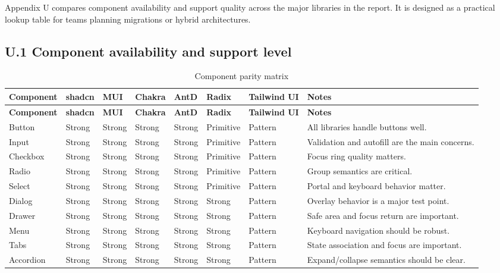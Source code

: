 Appendix U compares component availability and support quality across the major libraries in the report. It is designed as a practical lookup table for teams planning migrations or hybrid architectures.

\subsection*{U.1 Component availability and support level}
\begin{longtable}{@{}p{}p{}p{}p{}p{}p{}p{}p{}@{}}
\caption{Component parity matrix}\label{tab:parity-matrix}\\
\toprule
\textbf{Component} & \textbf{shadcn} & \textbf{MUI} & \textbf{Chakra} & \textbf{AntD} & \textbf{Radix} & \textbf{Tailwind UI} & \textbf{Notes} \\
\midrule
\endfirsthead
\toprule
\textbf{Component} & \textbf{shadcn} & \textbf{MUI} & \textbf{Chakra} & \textbf{AntD} & \textbf{Radix} & \textbf{Tailwind UI} & \textbf{Notes} \\
\midrule
\endhead
\bottomrule
\endfoot
Button & Strong & Strong & Strong & Strong & Primitive & Pattern & All libraries handle buttons well. \\
Input & Strong & Strong & Strong & Strong & Primitive & Pattern & Validation and autofill are the main concerns. \\
Checkbox & Strong & Strong & Strong & Strong & Primitive & Pattern & Focus ring quality matters. \\
Radio & Strong & Strong & Strong & Strong & Primitive & Pattern & Group semantics are critical. \\
Select & Strong & Strong & Strong & Strong & Primitive & Pattern & Portal and keyboard behavior matter. \\
Dialog & Strong & Strong & Strong & Strong & Strong & Pattern & Overlay behavior is a major test point. \\
Drawer & Strong & Strong & Strong & Strong & Strong & Pattern & Safe area and focus return are important. \\
Menu & Strong & Strong & Strong & Strong & Strong & Pattern & Keyboard navigation should be robust. \\
Tabs & Strong & Strong & Strong & Strong & Strong & Pattern & State association and focus are important. \\
Accordion & Strong & Strong & Strong & Strong & Strong & Pattern & Expand/collapse semantics should be clear. \\

\end{longtable}
